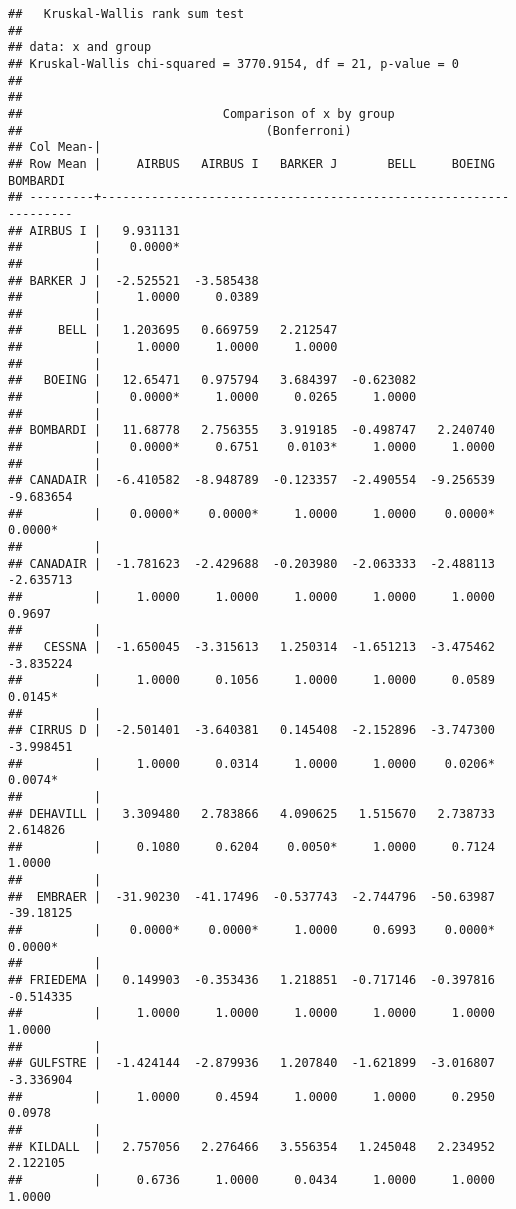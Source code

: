 \documentclass[
]{article}
\begin{document}
\begin{verbatim}
##   Kruskal-Wallis rank sum test
## 
## data: x and group
## Kruskal-Wallis chi-squared = 3770.9154, df = 21, p-value = 0
## 
## 
##                            Comparison of x by group                            
##                                  (Bonferroni)                                  
## Col Mean-|
## Row Mean |     AIRBUS   AIRBUS I   BARKER J       BELL     BOEING   BOMBARDI
## ---------+------------------------------------------------------------------
## AIRBUS I |   9.931131
##          |    0.0000*
##          |
## BARKER J |  -2.525521  -3.585438
##          |     1.0000     0.0389
##          |
##     BELL |   1.203695   0.669759   2.212547
##          |     1.0000     1.0000     1.0000
##          |
##   BOEING |   12.65471   0.975794   3.684397  -0.623082
##          |    0.0000*     1.0000     0.0265     1.0000
##          |
## BOMBARDI |   11.68778   2.756355   3.919185  -0.498747   2.240740
##          |    0.0000*     0.6751    0.0103*     1.0000     1.0000
##          |
## CANADAIR |  -6.410582  -8.948789  -0.123357  -2.490554  -9.256539  -9.683654
##          |    0.0000*    0.0000*     1.0000     1.0000    0.0000*    0.0000*
##          |
## CANADAIR |  -1.781623  -2.429688  -0.203980  -2.063333  -2.488113  -2.635713
##          |     1.0000     1.0000     1.0000     1.0000     1.0000     0.9697
##          |
##   CESSNA |  -1.650045  -3.315613   1.250314  -1.651213  -3.475462  -3.835224
##          |     1.0000     0.1056     1.0000     1.0000     0.0589    0.0145*
##          |
## CIRRUS D |  -2.501401  -3.640381   0.145408  -2.152896  -3.747300  -3.998451
##          |     1.0000     0.0314     1.0000     1.0000    0.0206*    0.0074*
##          |
## DEHAVILL |   3.309480   2.783866   4.090625   1.515670   2.738733   2.614826
##          |     0.1080     0.6204    0.0050*     1.0000     0.7124     1.0000
##          |
##  EMBRAER |  -31.90230  -41.17496  -0.537743  -2.744796  -50.63987  -39.18125
##          |    0.0000*    0.0000*     1.0000     0.6993    0.0000*    0.0000*
##          |
## FRIEDEMA |   0.149903  -0.353436   1.218851  -0.717146  -0.397816  -0.514335
##          |     1.0000     1.0000     1.0000     1.0000     1.0000     1.0000
##          |
## GULFSTRE |  -1.424144  -2.879936   1.207840  -1.621899  -3.016807  -3.336904
##          |     1.0000     0.4594     1.0000     1.0000     0.2950     0.0978
##          |
## KILDALL  |   2.757056   2.276466   3.556354   1.245048   2.234952   2.122105
##          |     0.6736     1.0000     0.0434     1.0000     1.0000     1.0000

\end{verbatim}
\end{document}
